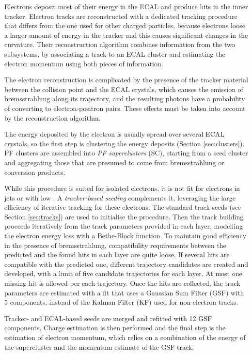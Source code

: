 Electrons deposit most of their energy in the ECAL and produce hits in the inner tracker.
Electron tracks are reconstructed with a dedicated tracking procedure that differs from the one used for other charged particles,
because electrons loose a larger amount of energy in the tracker and this causes significant changes in the curvature.
Their reconstruction algorithm combines information from the two subsystems,
by associating a track to an ECAL cluster and estimating the electron momentum using both pieces of information.

The electron reconstruction is complicated by the presence of the tracker material between the collision point and the ECAL crystals,
which causes the emission of bremsstrahlung along its trajectory, and the resulting photons have a probability of converting to electron-positron pairs.
These effects must be taken into account by the reconstruction algorithm.

The energy deposited by the electron is usually spread over several ECAL crystals, so the first step is clustering the energy deposits (Section \ref{sec:clusters}).
PF clusters are assembled into \textit{PF superclusters} (SC), starting from a seed cluster and aggregating those that are presumed to come from bremsstrahlung or conversion products.

While this procedure is suited for isolated electrons, it is not fit for electrons in jets or with low \pt.
A \textit{tracker-based seeding} complements it, leveraging the large efficiency of iterative tracking for these electrons.
The standard track seeds (see Section \ref{sec:tracks}) are used to initialise the procedure.
Then the track building proceeds iteratively from the track parameters provided in each layer, modelling the electron energy loss with a Bethe-Block function.
To maintain good efficiency in the presence of bremsstrahlung, compatibility requirements between the predicted and the found hits in each layer are quite loose.
If several hits are compatible with the predicted one, different trajectory candidates are created and developed,
with a limit of five candidate trajectories for each layer.
At most one missing hit is allowed per each trajectory.
Once the hits are collected, the track parameters are estimated with a fit that uses a Gaussian Sum Filter (GSF) \cite{CMS-NOTE-2005-001} with 5 components,
instead of the Kalman Filter (KF) \cite{billoir.qian:simultaneous} used for non-electron tracks.

Tracker- and ECAL-based seeds are merged and refitted with 12 GSF components.
Charge estimation is then performed and the final step is the estimation of electron momentum,
which relies on a combination of the energy of the supercluster and the momentum estimate of the GSF track.
